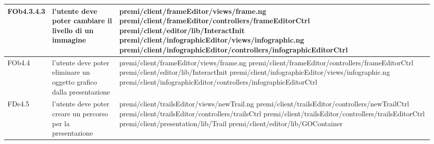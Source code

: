 \begin{longtable}{|l|p{5cm}|p{7cm}|}
\hline
FOb4.3.4.3 & l'utente deve poter cambiare il livello di un immagine & \hspace{0pt}premi/client/frameEditor/views/frame.ng \linebreak \linebreak premi/client/frameEditor/controllers/frameEditorCtrl \linebreak \linebreak premi/client/editor/lib/InteractInit \linebreak \linebreak premi/client/infographicEditor/views/infographic.ng \linebreak \linebreak premi/client/infographicEditor/controllers/infographicEditorCtrl \\
\hline
FOb4.4 & l'utente deve poter eliminare un oggetto grafico dalla presentazione & \hspace{0pt}premi/client/frameEditor/views/frame.ng \linebreak \linebreak premi/client/frameEditor/controllers/frameEditorCtrl \linebreak \linebreak premi/client/editor/lib/InteractInit \linebreak \linebreak premi/client/infographicEditor/views/infographic.ng \linebreak \linebreak premi/client/infographicEditor/controllers/infographicEditorCtrl \\
\hline
FDe4.5 & l'utente deve poter creare un percorso per la presentazione & \hspace{0pt}premi/client/trailsEditor/views/newTrail.ng \linebreak \linebreak premi/client/trailsEditor/controllers/newTrailCtrl \linebreak \linebreak premi/client/trailsEditor/controllers/trailsCtrl \linebreak \linebreak premi/client/trailsEditor/controllers/trailsEditorCtrl \linebreak \linebreak premi/client/presentation/lib/Trail \linebreak \linebreak premi/client/editor/lib/GOContainer \\

\end{longtable}
